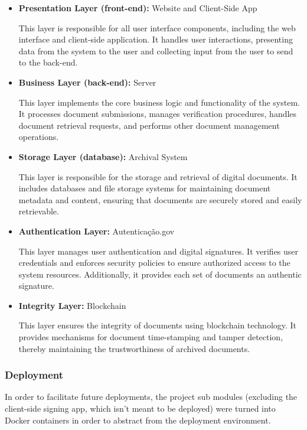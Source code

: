 \documentclass[a4paper,11pt]{article}
\begin{document}
                \begin{itemize}
                \item \textbf{Presentation Layer (front-end):} Website and Client-Side App
                
                    This layer is responsible for all user interface components, including the web interface and client-side application. It handles user interactions, presenting data from the system to the user and collecting input from the user to send to the back-end.
        
                \item \textbf{Business Layer (back-end):} Server
                
                    This layer implements the core business logic and functionality of the system. It processes document submissions, manages verification procedures, handles document retrieval requests, and performs other document management operations.
                    
                \item \textbf{Storage Layer (database):} Archival System
                
                    This layer is responsible for the storage and retrieval of digital documents. It includes databases and file storage systems for maintaining document metadata and content, ensuring that documents are securely stored and easily retrievable.

                \item \textbf{Authentication Layer:} Autenticação.gov
                
                    This layer manages user authentication and digital signatures. It verifies user credentials and enforces security policies to ensure authorized access to the system resources. Additionally, it provides each set of documents an authentic signature.
        
                \item \textbf{Integrity Layer:} Blockchain
                    
                    This layer ensures the integrity of documents using blockchain technology. It provides mechanisms for document time-stamping and tamper detection, thereby maintaining the trustworthiness of archived documents.

                \end{itemize}
                
            \subsubsection{Deployment}
                \quad In order to facilitate future deployments, the project sub modules (excluding the client-side signing app, which isn't meant to be deployed) were turned into Docker containers in order to abstract from the deployment environment.
\end{document}

